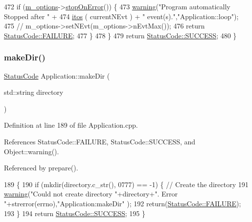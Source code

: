\begin{DoxyCode}
472     \textcolor{keywordflow}{if} (\hyperlink{classApplication_a3b0c74bf1ba99a5042990e3fefaa8963}{m\_options}->\hyperlink{classOptions_afcd7b27fdf474050d912571e09525efe}{stopOnError}()) \{
473       \hyperlink{classObject_a65cd4fda577711660821fd2cd5a3b4c9}{warning}(\textcolor{stringliteral}{"Program automatically Stopped after "} +
474           \hyperlink{Tools_8h_af330027dbdafb9a30768b3613c553e60}{itos} ( currentNEvt ) + \textcolor{stringliteral}{" event(s)."},\textcolor{stringliteral}{"Application::loop"});
475       \textcolor{comment}{//      m\_options->setNEvt(m\_options->nEvtMax());}
476       \textcolor{keywordflow}{return} \hyperlink{classStatusCode_a6f565cbeadc76d14c72f047e5e85eb4ba3da73d4c469762eb9d3c960368252b26}{StatusCode::FAILURE};
477     \}
478   \}
479   \textcolor{keywordflow}{return} \hyperlink{classStatusCode_a6f565cbeadc76d14c72f047e5e85eb4badd0da38d3ba0d922efd1f4619bc37ad8}{StatusCode::SUCCESS};
480 \}
\end{DoxyCode}
\mbox{\label{classApplication_accaba6b75f26c92e7604df43c853390b}} 
\subsubsection{\texorpdfstring{make\+Dir()}{makeDir()}}
{\footnotesize\ttfamily \hyperlink{classStatusCode}{Status\+Code} Application\+::make\+Dir (\begin{DoxyParamCaption}\item[{std\+::string}]{directory }\end{DoxyParamCaption})}



Definition at line 189 of file Application.\+cpp.



References Status\+Code\+::\+F\+A\+I\+L\+U\+RE, Status\+Code\+::\+S\+U\+C\+C\+E\+SS, and Object\+::warning().



Referenced by prepare().


\begin{DoxyCode}
189                                                      \{
190   \textcolor{keywordflow}{if} (mkdir(directory.c\_str(), 0777) == -1) \{ \textcolor{comment}{// Create the directory}
191     \hyperlink{classObject_a65cd4fda577711660821fd2cd5a3b4c9}{warning}(\textcolor{stringliteral}{"Could not create directory "}+directory+\textcolor{stringliteral}{". Error "}+strerror(errno),\textcolor{stringliteral}{"Application:makeDir"}
      );
192     \textcolor{keywordflow}{return}(\hyperlink{classStatusCode_a6f565cbeadc76d14c72f047e5e85eb4ba3da73d4c469762eb9d3c960368252b26}{StatusCode::FAILURE});
193   \}
194   \textcolor{keywordflow}{return} \hyperlink{classStatusCode_a6f565cbeadc76d14c72f047e5e85eb4badd0da38d3ba0d922efd1f4619bc37ad8}{StatusCode::SUCCESS};
195 \}
\end{DoxyCode}
\mbox{\label{classObject_a58b2d0618c2d08cf2383012611528d97}} 
